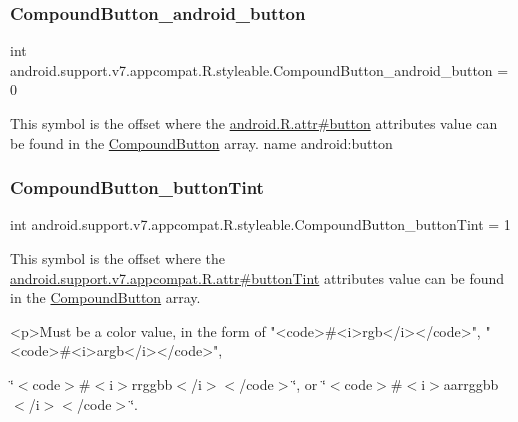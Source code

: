 \subsubsection{\texorpdfstring{Compound\+Button\+\_\+android\+\_\+button}{CompoundButton\_android\_button}}
{\footnotesize\ttfamily int android.\+support.\+v7.\+appcompat.\+R.\+styleable.\+Compound\+Button\+\_\+android\+\_\+button = 0\hspace{0.3cm}{\ttfamily [static]}}

This symbol is the offset where the \hyperlink{}{android.\+R.\+attr\#button} attribute\textquotesingle{}s value can be found in the \hyperlink{classandroid_1_1support_1_1v7_1_1appcompat_1_1R_1_1styleable_aa66e991e0d5dc9db5a9048c91817235f}{Compound\+Button} array.  name android\+:button \mbox{\label{classandroid_1_1support_1_1v7_1_1appcompat_1_1R_1_1styleable_a332cba791529259530adf3858cb6f97b}} 
\subsubsection{\texorpdfstring{Compound\+Button\+\_\+button\+Tint}{CompoundButton\_buttonTint}}
{\footnotesize\ttfamily int android.\+support.\+v7.\+appcompat.\+R.\+styleable.\+Compound\+Button\+\_\+button\+Tint = 1\hspace{0.3cm}{\ttfamily [static]}}

This symbol is the offset where the \hyperlink{classandroid_1_1support_1_1v7_1_1appcompat_1_1R_1_1attr_ae026a3a33583df459d33e3c0a97759f4}{android.\+support.\+v7.\+appcompat.\+R.\+attr\#button\+Tint} attribute\textquotesingle{}s value can be found in the \hyperlink{classandroid_1_1support_1_1v7_1_1appcompat_1_1R_1_1styleable_aa66e991e0d5dc9db5a9048c91817235f}{Compound\+Button} array.

\begin{DoxyVerb}      <p>Must be a color value, in the form of "<code>#<i>rgb</i></code>", "<code>#<i>argb</i></code>",
\end{DoxyVerb}
 \char`\"{}$<$code$>$\#$<$i$>$rrggbb$<$/i$>$$<$/code$>$\char`\"{}, or \char`\"{}$<$code$>$\#$<$i$>$aarrggbb$<$/i$>$$<$/code$>$\char`\"{}. 

